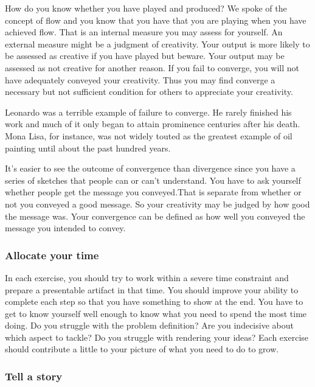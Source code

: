 How do you know whether you have played and produced? We spoke of the
concept of flow and you know that you have that you are playing when you
have achieved flow. That is an internal measure you may assess for
yourself. An external measure might be a judgment of creativity. Your
output is more likely to be assessed as creative if you have played but
beware. Your output may be assessed as not creative for another reason.
If you fail to converge, you will not have adequately conveyed your
creativity. Thus you may find converge a necessary but not sufficient
condition for others to appreciate your creativity.

Leonardo was a terrible example of failure to converge. He rarely
finished his work and much of it only began to attain prominence
centuries after his death. Mona Lisa, for instance, was not widely
touted as the greatest example of oil painting until about the past
hundred years.

It's easier to see the outcome of convergence than divergence since you
have a series of sketches that people can or can't understand. You have
to ask yourself whether people get the message you conveyed.That is
separate from whether or not you conveyed a good message. So your
creativity may be judged by how good the message was. Your convergence
can be defined as how well you conveyed the message you intended to
convey.

\hypertarget{allocate-your-time}{%
\subsubsection{Allocate your time}\label{allocate-your-time}}

In each exercise, you should try to work within a severe time constraint
and prepare a presentable artifact in that time. You should improve your
ability to complete each step so that you have something to show at the
end. You have to get to know yourself well enough to know what you need
to spend the most time doing. Do you struggle with the problem
definition? Are you indecisive about which aspect to tackle? Do you
struggle with rendering your ideas? Each exercise should contribute a
little to your picture of what you need to do to grow.

\hypertarget{tell-a-story}{%
\subsubsection{Tell a story}\label{tell-a-story}}

